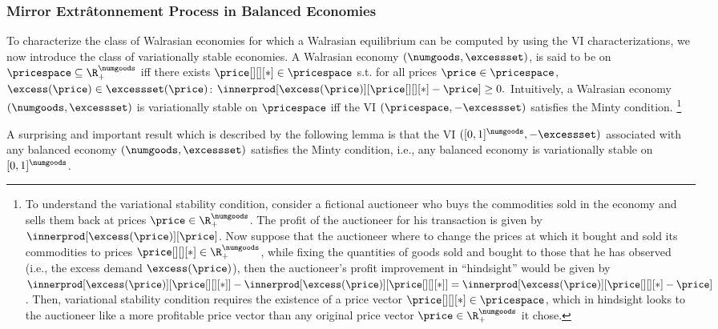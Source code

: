 \subsubsection{Mirror Extr\^atonnement Process in Balanced Economies}

To characterize the class of Walrasian economies for which a Walrasian equilibrium can be computed by using the VI characterizations, we now introduce the class of variationally stable economies. A Walrasian economy $(\numgoods, \excessset)$, is said to be  on $\pricespace \subseteq \R^\numgoods_+$ iff there exists $\price[][][*] \in \pricespace$ s.t. for all prices $\price \in \pricespace$, $\excess(\price) \in \excessset(\price)$:
$
        \innerprod[{ \excess(\price)}][{\price[][][*] - \price}] \geq 0.
$ Intuitively, a Walrasian economy $(\numgoods, \excessset)$ is variationally stable on $\pricespace$ iff the VI $(\pricespace, -\excessset)$ satisfies the Minty condition.
\footnote{
To understand the variational stability condition, consider a fictional auctioneer who buys the commodities sold in the economy and sells them back at prices $\price \in \R^\numgoods_+$. The profit of the auctioneer for his transaction is given by $\innerprod[{ \excess(\price)}][{\price}]$. Now suppose that the auctioneer where to change the prices at which it bought and sold its commodities to prices $\price[][][*] \in \R^\numgoods_+$, while fixing the quantities of goods sold and bought to those that he has observed (i.e., the excess demand $\excess(\price)$), then the auctioneer's profit improvement in ``hindsight'' would be given by $\innerprod[{ \excess(\price)}][{\price[][][*]}] - \innerprod[{ \excess(\price)}][{\price[][][*]}] =  \innerprod[{ \excess(\price)}][{\price[][][*] - \price}]$. Then, variational stability condition requires the existence of a price vector $\price[][][*]  \in \pricespace$, which in hindsight looks to the auctioneer like a more profitable price vector than any original price vector $\price \in \R^\numgoods_+$ it chose. 
}

A surprising and important result which is described by the following lemma is that the VI $([0, 1]^\numgoods, -\excessset)$ associated with any balanced economy $(\numgoods, \excessset)$ satisfies the Minty condition, i.e., any balanced economy is variationally stable on $[0, 1]^\numgoods$.


